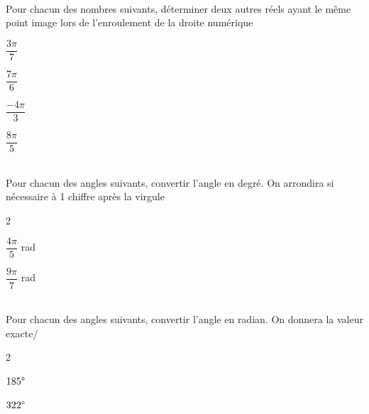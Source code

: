 \documentclass[a4paper,11pt]{article}        %
\begin{document}
\\
Pour chacun des nombres suivants, déterminer deux autres réels ayant le même point image lors de l'enroulement de la droite numérique
\begin{enumMet}
	\item $\dfrac{3\pi}{7}$ \quad  {}
	\item $\dfrac{7\pi}{6}$ \quad  {}
	\item $\dfrac{-4\pi}{3}$ \quad  {}
	\item $\dfrac{8\pi}{5}$\quad  {}
\end{enumMet}

\\
Pour chacun des angles suivants, convertir l'angle en degré. On arrondira si nécessaire à 1 chiffre après la virgule
\begin{multicols}{2}
	\begin{enumMet}
		\item $\dfrac{4\pi}{5}$ rad \quad {}
		\item $\dfrac{9\pi}{7}$ rad \quad {}
	\end{enumMet}
\end{multicols}

\\
Pour chacun des angles suivants, convertir l'angle en radian. On donnera la valeur exacte/
\begin{multicols}{2}
	\begin{enumMet}
		\item $185\degree$ \quad \corr{$=185\times \dfrac{\pi}{180}=\dfrac{37\pi}{36}$ rad}
		\item $322\degree$ \quad \corr{$=322\times \dfrac{\pi}{180}=\dfrac{161\pi}{90}$ rad}
	\end{enumMet}
\end{multicols}
\end{document}
